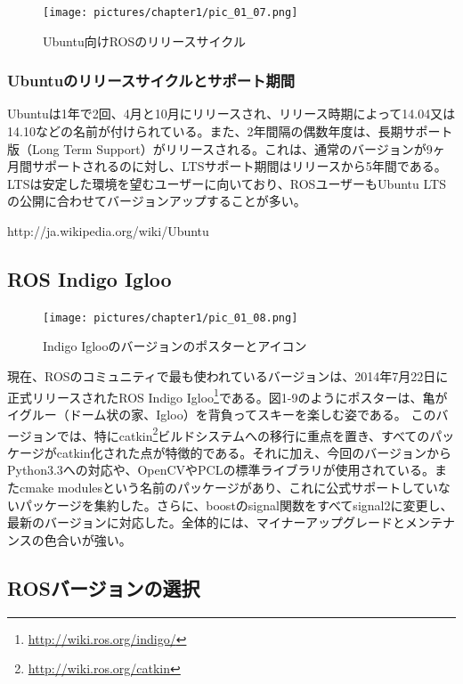 \begin{figure}[h]
  \centering
  \texttt{[image: pictures/chapter1/pic\_01\_07.png]}
  \caption{Ubuntu向けROSのリリースサイクル}
\end{figure}

\subsubsection{Ubuntuのリリースサイクルとサポート期間}

Ubuntuは1年で2回、4月と10月にリリースされ、リリース時期によって14.04又は14.10などの名前が付けられている。また、2年間隔の偶数年度は、長期サポート版（Long Term Support）がリリースされる。これは、通常のバージョンが9ヶ月間サポートされるのに対し、LTSサポート期間はリリースから5年間である。LTSは安定した環境を望むユーザーに向いており、ROSユーザーもUbuntu LTSの公開に合わせてバージョンアップすることが多い。

\noindent http://ja.wikipedia.org/wiki/Ubuntu

\subsection{ROS Indigo Igloo}

\begin{figure}[h]
  \centering
  \texttt{[image: pictures/chapter1/pic\_01\_08.png]}
  \caption{Indigo Iglooのバージョンのポスターとアイコン}
\end{figure}

現在、ROSのコミュニティで最も使われているバージョンは、2014年7月22日に正式リリースされたROS Indigo Igloo\footnote{\url{http://wiki.ros.org/indigo/}}である。図1-9のようにポスターは、亀がイグルー（ドーム状の家、Igloo）を背負ってスキーを楽しむ姿である。
このバージョンでは、特にcatkin\footnote{\url{http://wiki.ros.org/catkin}}ビルドシステムへの移行に重点を置き、すべてのパッケージがcatkin化された点が特徴的である。それに加え、今回のバージョンからPython3.3への対応や、OpenCVやPCLの標準ライブラリが使用されている。またcmake modulesという名前のパッケージがあり、これに公式サポートしていないパッケージを集約した。さらに、boostのsignal関数をすべてsignal2に変更し、最新のバージョンに対応した。全体的には、マイナーアップグレードとメンテナンスの色合いが強い。

\subsection{ROSバージョンの選択}

